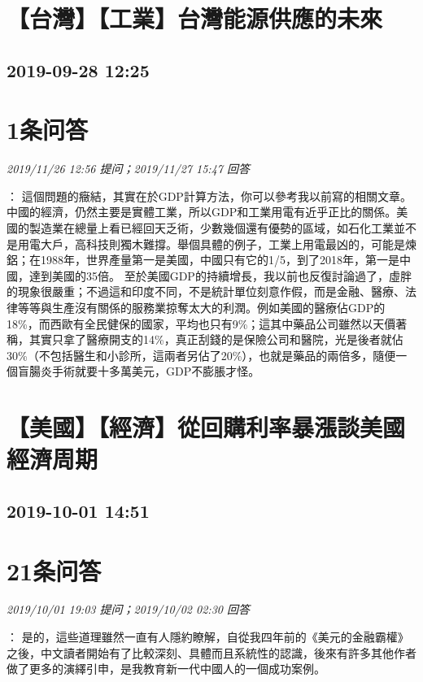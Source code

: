 \documentclass[twocolumn]{ctexart}
\begin{document}
\section{【台灣】【工業】台灣能源供應的未來}
\subsection{2019-09-28 12:25}


\section{1条问答}

\textit{\hfill\noindent\small 2019/11/26 12:56 提问；2019/11/27 15:47 回答}

：
這個問題的癥結，其實在於GDP計算方法，你可以參考我以前寫的相關文章。 
中國的經濟，仍然主要是實體工業，所以GDP和工業用電有近乎正比的關係。美國的製造業在總量上看已經回天乏術，少數幾個還有優勢的區域，如石化工業並不是用電大戶，高科技則獨木難撐。舉個具體的例子，工業上用電最凶的，可能是煉鋁；在1988年，世界產量第一是美國，中國只有它的1/5，到了2018年，第一是中國，達到美國的35倍。 
至於美國GDP的持續增長，我以前也反復討論過了，虛胖的現象很嚴重；不過這和印度不同，不是統計單位刻意作假，而是金融、醫療、法律等等與生產沒有關係的服務業掠奪太大的利潤。例如美國的醫療佔GDP的18\%，而西歐有全民健保的國家，平均也只有9\%；這其中藥品公司雖然以天價著稱，其實只拿了醫療開支的14\%，真正刮錢的是保險公司和醫院，光是後者就佔30\%（不包括醫生和小診所，這兩者另佔了20\%），也就是藥品的兩倍多，隨便一個盲腸炎手術就要十多萬美元，GDP不膨脹才怪。
\\


\section{【美國】【經濟】從回購利率暴漲談美國經濟周期}
\subsection{2019-10-01 14:51}


\section{21条问答}

\textit{\hfill\noindent\small 2019/10/01 19:03 提问；2019/10/02 02:30 回答}

：
是的，這些道理雖然一直有人隱約瞭解，自從我四年前的《美元的金融霸權》之後，中文讀者開始有了比較深刻、具體而且系統性的認識，後來有許多其他作者做了更多的演繹引申，是我教育新一代中國人的一個成功案例。
\\
\end{document}
